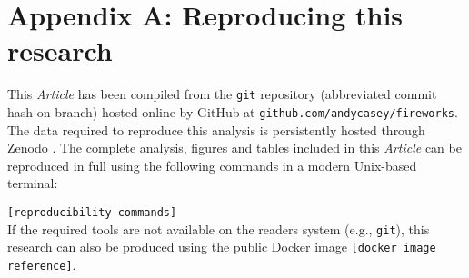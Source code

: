 \documentclass[useAMS,usenatbib]{mn2e}
\newcommand\article{\textit{Article}}
\begin{document}
\label{lastpage}

\section{Appendix A: Reproducing this research}
This \article{} has been compiled from the \texttt{git} repository (abbreviated commit hash \texttt{\gitAbbrevHash} on \texttt{\gitBranch} branch) hosted online by GitHub at \texttt{github.com/andycasey/fireworks}. The data required to reproduce this analysis is persistently hosted through Zenodo \citep{DATA}. The complete analysis, figures and tables included in this \article{} can be reproduced in full using the following commands in a modern Unix-based terminal:
\vspace{0.5em}

\noindent\texttt{[reproducibility commands]} 
\vspace{0.5em} \\
If the required tools are not available on the readers system (e.g., \texttt{git}), this research can also be produced using the public Docker image \texttt{[docker image reference]}.
\end{document}
